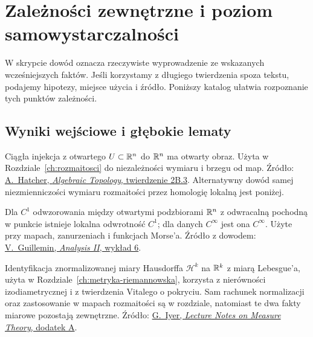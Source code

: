 \chapter{Zależności zewnętrzne i poziom samowystarczalności}
\label{app:wyniki-zewnetrzne}

W skrypcie dowód oznacza rzeczywiste
wyprowadzenie ze wskazanych wcześniejszych
faktów. Jeśli korzystamy z długiego
twierdzenia spoza tekstu, podajemy
hipotezy, miejsce użycia i źródło.
Poniższy katalog ułatwia rozpoznanie
tych punktów zależności.

\section{Wyniki wejściowe i głębokie lematy}
\label{sec:katalog-wynikow}

\begin{description}[leftmargin=2.9cm,style=nextline]
\item[Niezmienniczość obszaru.]
  Ciągła injekcja z otwartego
  $U\subset\mathbb{R}^n$ do $\mathbb{R}^n$
  ma otwarty obraz. Użyta w
  Rozdziale~\ref{ch:rozmaitosci}
  do niezależności wymiaru i
  brzegu od map.
  Źródło:
  \href{https://pi.math.cornell.edu/~hatcher/AT/AT.pdf}
  {A.\ Hatcher, \emph{Algebraic Topology},
  twierdzenie 2B.3}.
  Alternatywny dowód samej
  niezmienniczości wymiaru rozmaitości
  przez homologię lokalną jest poniżej.

\item[Twierdzenie o funkcji odwrotnej.]
  Dla $C^1$ odwzorowania między
  otwartymi podzbiorami $\mathbb{R}^n$
  z odwracalną pochodną w punkcie
  istnieje lokalna odwrotność $C^1$;
  dla danych $C^\infty$ jest ona
  $C^\infty$. Użyte przy mapach,
  zanurzeniach i funkcjach Morse'a.
  Źródło z dowodem:
  \href{https://www.ocw.mit.edu/courses/18-101-analysis-ii-fall-2005/d2c8fc5fe57cd59efc99caa048983d4c_lecture6.pdf}
  {V.\ Guillemin, \emph{Analysis II},
  wykład 6}.

\item[Miara Hausdorffa w przestrzeni euklidesowej.]
  Identyfikacja znormalizowanej miary Hausdorffa
  $\mathcal H^k$ na $\mathbb{R}^k$ z miarą Lebesgue'a,
  użyta w Rozdziale~\ref{ch:metryka-riemannowska},
  korzysta z nierówności izodiametrycznej i z twierdzenia
  Vitalego o pokryciu. Sam rachunek normalizacji oraz
  zastosowanie w mapach rozmaitości są w rozdziale,
  natomiast te dwa fakty miarowe pozostają zewnętrzne.
  Źródło:
  \href{https://www.math.cmu.edu/~gautam/sj/teaching/2022-23/720-measure/pdfs/measure.pdf}
  {G.\ Iyer, \emph{Lecture Notes on Measure Theory},
  dodatek A}.


\end{description}
